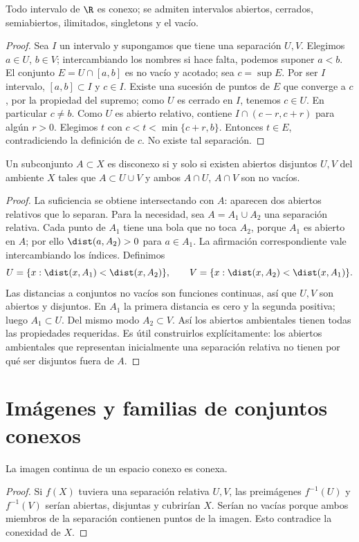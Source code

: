 \begin{lema}\label{ch17:intervalos}
Todo intervalo de $\R$ es conexo; se admiten intervalos abiertos, cerrados, semiabiertos, ilimitados, singletons y el vacío.
\end{lema}
\begin{proof}
Sea $I$ un intervalo y supongamos que tiene una separación $U,V$. Elegimos $a\in U$, $b\in V$; intercambiando los nombres si hace falta, podemos suponer $a<b$. El conjunto $E=U\cap[a,b]$ es no vacío y acotado; sea $c=\sup E$. Por ser $I$ intervalo, $[a,b]\subset I$ y $c\in I$. Existe una sucesión de puntos de $E$ que converge a $c$, por la propiedad del supremo; como $U$ es cerrado en $I$, tenemos $c\in U$. En particular $c\ne b$. Como $U$ es abierto relativo, contiene $I\cap(c-r,c+r)$ para algún $r>0$. Elegimos $t$ con $c<t<\min\{c+r,b\}$. Entonces $t\in E$, contradiciendo la definición de $c$. No existe tal separación.
\end{proof}

\begin{proposicion}\label{ch17:ambiental}
Un subconjunto $A\subset X$ es disconexo si y solo si existen abiertos disjuntos $U,V$ del ambiente $X$ tales que $A\subset U\cup V$ y ambos $A\cap U$, $A\cap V$ son no vacíos.
\end{proposicion}
\begin{proof}
La suficiencia se obtiene intersectando con $A$: aparecen dos abiertos relativos que lo separan. Para la necesidad, sea $A=A_1\cup A_2$ una separación relativa. Cada punto de $A_1$ tiene una bola que no toca $A_2$, porque $A_1$ es abierto en $A$; por ello $\dist(a,A_2)>0$ para $a\in A_1$. La afirmación correspondiente vale intercambiando los índices. Definimos
\[
U=\{x:\dist(x,A_1)<\dist(x,A_2)\},\qquad
V=\{x:\dist(x,A_2)<\dist(x,A_1)\}.
\]
Las distancias a conjuntos no vacíos son funciones continuas, así que $U,V$ son abiertos y disjuntos. En $A_1$ la primera distancia es cero y la segunda positiva; luego $A_1\subset U$. Del mismo modo $A_2\subset V$. Así los abiertos ambientales tienen todas las propiedades requeridas. Es útil construirlos explícitamente: los abiertos ambientales que representan inicialmente una separación relativa no tienen por qué ser disjuntos fuera de $A$.
\end{proof}

\section{Imágenes y familias de conjuntos conexos}
\begin{teorema}\label{ch17:imagen}
La imagen continua de un espacio conexo es conexa.
\end{teorema}
\begin{proof}
Si $f(X)$ tuviera una separación relativa $U,V$, las preimágenes $f^{-1}(U)$ y $f^{-1}(V)$ serían abiertas, disjuntas y cubrirían $X$. Serían no vacías porque ambos miembros de la separación contienen puntos de la imagen. Esto contradice la conexidad de $X$.
\end{proof}

